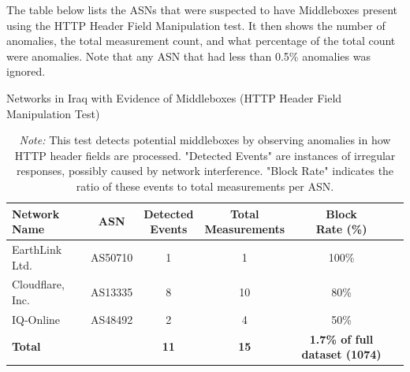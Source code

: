 The table below lists the ASNs that were suspected to have Middleboxes present using the HTTP Header Field Manipulation test. It then shows the number of anomalies, the total measurement count, and what percentage of the total count were anomalies. Note that any ASN that had less than 0.5\% anomalies was ignored.

\vspace{2em}

\begin{table}[H]
\centering
\caption{Networks in Iraq with Evidence of Middleboxes (HTTP Header Field Manipulation Test)}
\begin{tabular}{lccccc}
\toprule
\textbf{Network Name} & \textbf{ASN} & \shortstack{\textbf{Detected} \\ \textbf{Events}} & \shortstack{\textbf{Total} \\ \textbf{Measurements}} & \shortstack{\textbf{Block} \\ \textbf{Rate (\%)}} \\
\midrule
EarthLink Ltd.        & AS50710  & 1 & 1  & 100\%  \\
Cloudflare, Inc.      & AS13335  & 8 & 10 & 80\%   \\
IQ-Online             & AS48492  & 2 & 4  & 50\%   \\
\bottomrule
\textbf{Total} & & \textbf{11} & \textbf{15} & \textbf{1.7\% of full dataset (1074)} \\
\end{tabular}

\vspace{1em}

\begin{minipage}{0.95\linewidth}
\caption*{\textit{Note:} This test detects potential middleboxes by observing anomalies in how HTTP header fields are processed. "Detected Events" are instances of irregular responses, possibly caused by network interference. "Block Rate" indicates the ratio of these events to total measurements per ASN.}
\end{minipage}
\label{tab:middlebox_http_header}
\end{table}







